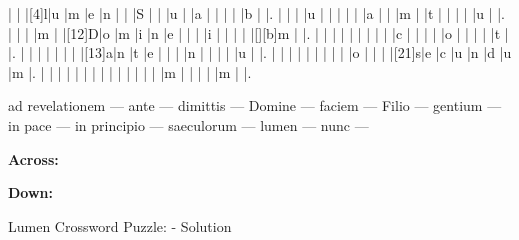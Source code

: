 \documentclass[12pt]{article}
\begin{document}
\begin{Puzzle}{22}{24}
  |{}  |{}  |[4]l|u   |m   |e   |n   |{}  |{}  |S   |{}  |{}  |u   |{}  |a   |{}  |{}  |{}  |{}  |b   |{}  |.
  |{}  |{}  |{}  |u   |{}  |{}  |{}  |{}  |{}  |a   |{}  |{}  |m   |{}  |t   |{}  |{}  |{}  |{}  |u   |{}  |.
  |{}  |{}  |{}  |m   |{}  |[12]D|o   |m   |i   |n   |e   |{}  |{}  |{}  |i   |{}  |{}  |{}  |{}  |[][b]m   |{}  |.
  |{}  |{}  |{}  |{}  |{}  |{}  |{}  |{}  |{}  |c   |{}  |{}  |{}  |{}  |o   |{}  |{}  |{}  |{}  |t   |{}  |.
  |{}  |{}  |{}  |{}  |{}  |{}  |{}  |[13]a|n   |t   |e   |{}  |{}  |{}  |n   |{}  |{}  |{}  |{}  |u   |{}  |.
  |{}  |{}  |{}  |{}  |{}  |{}  |{}  |{}  |{}  |o   |{}  |{}  |{}  |[21]s|e   |c   |u   |n   |d   |u   |m   |.
  |{}  |{}  |{}  |{}  |{}  |{}  |{}  |{}  |{}  |{}  |{}  |{}  |{}  |{}  |m   |{}  |{}  |{}  |{}  |m   |{}  |.
\end{Puzzle}
\begin{rotate}{90}
\small 
ad revelationem --- ante --- dimittis --- Domine --- faciem --- Filio --- gentium --- in pace --- in principio --- saeculorum --- lumen --- nunc --- \end{rotate}
\hspace{-10pt}
\begin{PuzzleClues}{\textbf{Across:}}
\end{PuzzleClues}
\begin{PuzzleClues}{\textbf{Down:}}
\end{PuzzleClues}
\newpage
\begin{center}
  \huge{Lumen Crossword Puzzle: - Solution}
\end{center}
\vspace{1.5cm}
\PuzzleSolution
\end{document}
